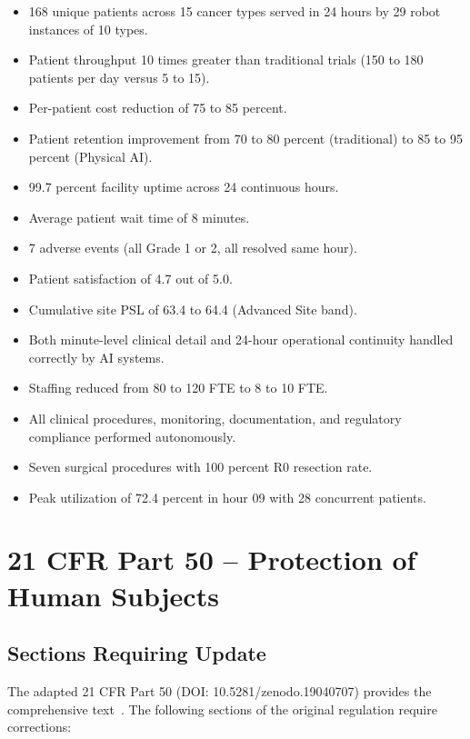 \documentclass[11pt,letterpaper]{article}
\begin{document}
\begin{itemize}
\item 168 unique patients across 15 cancer types served in 24 hours by 29
  robot instances of 10 types.
\item Patient throughput 10 times greater than traditional trials (150 to 180
  patients per day versus 5 to 15).
\item Per-patient cost reduction of 75 to 85 percent.
\item Patient retention improvement from 70 to 80 percent (traditional) to
  85 to 95 percent (Physical AI).
\item 99.7 percent facility uptime across 24 continuous hours.
\item Average patient wait time of 8 minutes.
\item 7 adverse events (all Grade 1 or 2, all resolved same hour).
\item Patient satisfaction of 4.7 out of 5.0.
\item Cumulative site PSL of 63.4 to 64.4 (Advanced Site band).
\item Both minute-level clinical detail and 24-hour operational continuity
  handled correctly by AI systems.
\item Staffing reduced from 80 to 120 FTE to 8 to 10 FTE.
\item All clinical procedures, monitoring, documentation, and regulatory
  compliance performed autonomously.
\item Seven surgical procedures with 100 percent R0 resection rate.
\item Peak utilization of 72.4 percent in hour 09 with 28 concurrent patients.
\end{itemize}

\section{21 CFR Part 50 -- Protection of Human Subjects}

\subsection{Sections Requiring Update}

The adapted 21 CFR Part 50 (DOI: 10.5281/zenodo.19040707) provides the
comprehensive text~\cite{cfr50adapt}. The following sections of the original
regulation require corrections:
\end{document}
